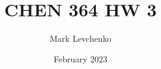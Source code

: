 \documentclass[12pt]{article}
\title{CHEN 364 HW 3}
\author{Mark Levchenko}
\date{February 2023}
\begin{document}
\begin{enumerate}
 
    

    

    

    

\end{enumerate}
\end{document}
